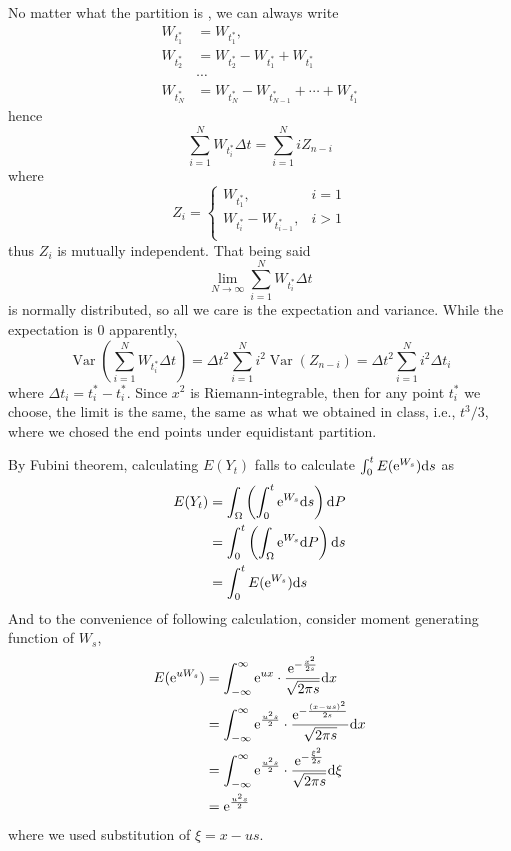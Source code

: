 \documentclass{homework}
\DeclareMathOperator{\var}{Var}
\begin{document}
    \problem
    No matter what the partition is
    , we can always write
    \[\begin{aligned}
        W_{t^*_1}&=W_{t^*_1},\\
        W_{t^*_2}&=W_{t^*_2}-W_{t^*_1}+W_{t^*_1}\\
        &\cdots\\
        W_{t^*_N}&=W_{t^*_N}-W_{t^*_{N-1}}+\cdots+W_{t^*_1}
    \end{aligned}\]
    hence
    \[\sum_{i=1}^NW_{t^*_i}\Delta t=\sum_{i=1}^NiZ_{n-i}\]
    where
    \[Z_i=\begin{cases}
        W_{t^*_1},&i=1\\
        W_{t^*_i}-W_{t^*_{i-1}},&i>1\\
    \end{cases}\]
    thus $Z_i$ is mutually independent.
    That being said
    \[\lim_{N\to\infty}\sum_{i=1}^N W_{t_i^*}\Delta t\]
    is normally distributed, so all we care is the expectation
    and variance. While the expectation is 0 apparently,
    \[\var\left(\sum_{i=1}^N W_{t_i^*}\Delta t\right)
    =\Delta t^2\sum_{i=1}^Ni^2\var(Z_{n-i})
    =\Delta t^2\sum_{i=1}^Ni^2\Delta t_i\]
    where $\Delta t_i=t^*_i-t^*_i$.
    Since $x^2$ is Riemann-integrable, then for any point $t_i^*$
    we choose, the limit is the same, the same as what we obtained
    in class, i.e., $t^3/3$, where we chosed the end points under
    equidistant partition.

    \problem
    By Fubini theorem, calculating $E(Y_t)$ falls to
    calculate $\int_0^tE(\mathrm e^{W_s})\mathrm d s$ as
    \[\begin{aligned}
    E(Y_t)&=\int_\Omega\left(\int_0^t\mathrm e^{W_s}\mathrm d s\right)\mathrm d P\\
    &=\int_0^t\left(\int_\Omega\mathrm e^{W_s}\mathrm d P\right)\mathrm d s\\
    &=\int_0^tE(\mathrm e^{W_s})\mathrm d s \\
    \end{aligned}\]
    And to the convenience of following calculation, consider moment
    generating function of $W_s$,
    \begin{equation}
        \label{eq:mgf}
        \begin{aligned}
        E(\mathrm e^{uW_s})&=\int_{-\infty}^\infty\mathrm e^{ux}\cdot
        \frac{\mathrm e^{-\frac{x^2}{2s}}}{\sqrt{2\pi s}}\mathrm d x\\
        &=\int_{-\infty}^\infty\mathrm e^{\frac{u^2s}{2}}
        \cdot\frac{\mathrm e^{-\frac{(x-us)^2}{2s}}}{\sqrt{2\pi s}}\mathrm d x\\
        &=\int_{-\infty}^\infty\mathrm e^{\frac{u^2s}{2}}
        \cdot\frac{\mathrm e^{-\frac{\xi^2}{2s}}}{\sqrt{2\pi s}}\mathrm d\xi\\
        &=\mathrm e^{\frac{u^2s}{2}}
        \end{aligned}
    \end{equation}
    where we used substitution of $\xi=x-us$.
\end{document}
